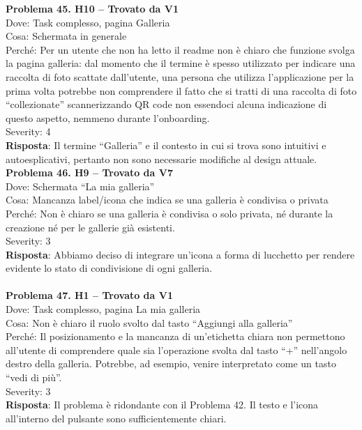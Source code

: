 \documentclass{article}
\begin{document}
\noindent \textbf{Problema 45. H10 – Trovato da V1} \\
Dove: Task complesso, pagina Galleria \\
Cosa: Schermata in generale \\
Perché: Per un utente che non ha letto il readme non è chiaro che funzione svolga la pagina galleria: dal momento che il termine è spesso utilizzato per indicare una raccolta di foto scattate dall’utente, una persona che utilizza l’applicazione per la prima volta potrebbe non comprendere il fatto che si tratti di una raccolta di foto “collezionate” scannerizzando QR code non essendoci alcuna indicazione di questo aspetto, nemmeno durante l’onboarding. \\
Severity: 4 \\
\textbf{Risposta}: Il termine “Galleria” e il contesto in cui si trova sono intuitivi e autoesplicativi, pertanto non sono necessarie modifiche al design attuale.\\

\noindent \textbf{Problema 46. H9 – Trovato da V7} \\
Dove: Schermata “La mia galleria” \\
Cosa: Mancanza label/icona che indica se una galleria è condivisa o privata \\
Perché: Non è chiaro se una galleria è condivisa o solo privata, né durante la creazione né per le gallerie già esistenti. \\
Severity: 3 \\
\textbf{Risposta}: Abbiamo deciso di integrare un’icona a forma di lucchetto per rendere evidente lo stato di condivisione di ogni galleria.\\ \\

\noindent \textbf{Problema 47. H1 – Trovato da V1} \\
Dove: Task complesso, pagina La mia galleria \\
Cosa: Non è chiaro il ruolo svolto dal tasto “Aggiungi alla galleria” \\
Perché: Il posizionamento e la mancanza di un’etichetta chiara non permettono all’utente di comprendere quale sia l’operazione svolta dal tasto “+” nell’angolo destro della galleria. Potrebbe, ad esempio, venire interpretato come un tasto “vedi di più”. \\
Severity: 3 \\
\textbf{Risposta}: Il problema è ridondante con il Problema 42. Il testo e l’icona all’interno del pulsante sono sufficientemente chiari.\\
\end{document}
